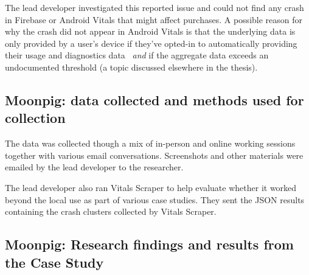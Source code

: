 The lead developer investigated this reported issue and could not find any crash in Firebase or Android Vitals that might affect purchases. A possible reason for why the crash did not appear in Android Vitals is that the underlying data is only provided by a user's device if they've opted-in to automatically providing their usage and diagnostics data~\citep{google_play_view_crashes_and_anr_errors} \textit{and} if the aggregate data exceeds an undocumented threshold (a topic discussed elsewhere in the thesis).

\subsection{Moonpig: data collected and methods used for collection}
The data was collected though a mix of in-person and online working sessions together with various email conversations. Screenshots and other materials were emailed by the lead developer to the researcher. 

The lead developer also ran Vitals Scraper to help evaluate whether it worked beyond the local use as part of various case studies. They sent the JSON results containing the crash clusters collected by Vitals Scraper.  

\subsection{Moonpig: Research findings and results from the Case Study}

